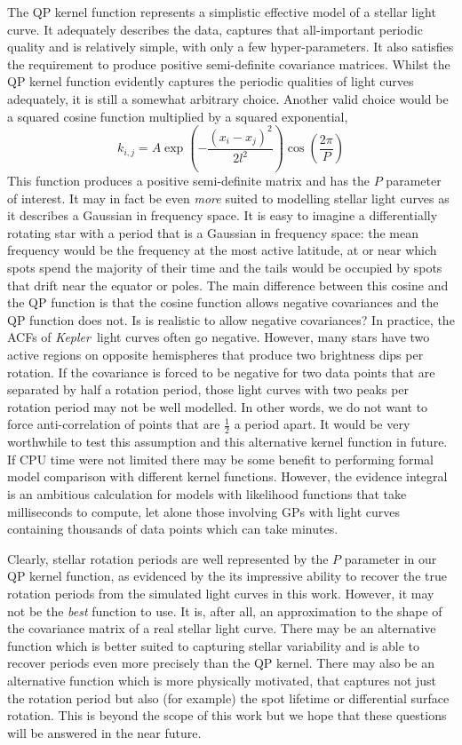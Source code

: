 \documentclass[useAMS, usenatbib, preprint, 12pt]{aastex}
\newcommand{\Kepler}{{\it Kepler}}
\begin{document}
The QP kernel function represents a simplistic effective model of a stellar
light curve.
It adequately describes the data, captures that all-important periodic quality
and is relatively simple, with only a few hyper-parameters.
It also satisfies the requirement to produce positive semi-definite covariance
matrices.
Whilst the QP kernel function evidently captures the periodic qualities of
light curves adequately, it is still a somewhat arbitrary choice.
Another valid choice would be a squared cosine function multiplied by a
squared exponential,
\begin{equation}
k_{i,j} = A \exp \left(-\frac{(x_i - x_j)^2}{2l^2}\right)
\cos\left(\frac{2\pi}{P}\right)
\end{equation}
\label{eq:cos_kernel}
This function produces a positive semi-definite matrix and has the $P$
parameter of interest.
It may in fact be even {\it more} suited to modelling stellar
light curves as it describes a Gaussian in frequency space.
It is easy to imagine a differentially rotating star with a period that is a
Gaussian in frequency space: the mean frequency would be the frequency at the
most active latitude, at or near which spots spend the majority of their time
and the tails would be occupied by spots that drift near the equator or poles.
The main difference between this cosine and the QP function is that the cosine
function allows negative covariances and the QP function does not.
Is is realistic to allow negative covariances?
In practice, the ACFs of \Kepler\ light curves often go negative.
However, many stars have two active regions on opposite hemispheres that
produce two brightness dips per rotation.
If the covariance is forced to be negative for two data points that are
separated by half a rotation period, those light curves with two peaks per
rotation period may not be well modelled.
In other words, we do not want to force anti-correlation of points that are
$\frac{1}{2}$ a period apart.
It would be very worthwhile to test this assumption and this alternative
kernel function in future.
If CPU time were not limited there may be some benefit to performing formal
model comparison with different kernel functions.
However, the evidence integral is an ambitious calculation for models with
likelihood functions that take milliseconds to compute, let alone those
involving GPs with light curves containing thousands of data points which can
take minutes.

Clearly, stellar rotation periods are well represented by the $P$ parameter in
our QP kernel function, as evidenced by the its impressive ability to recover
the true rotation periods from the simulated light curves in this work.
However, it may not be the {\it best} function to use.
It is, after all, an approximation to the shape of the covariance matrix of a
real stellar light curve.
There may be an alternative function which is better suited to capturing
stellar variability and is able to recover periods even more precisely than
the QP kernel.
There may also be an alternative function which is more physically motivated,
that captures not just the rotation period but also (for example) the spot
lifetime or differential surface rotation.
This is beyond the scope of this work but we hope that these questions will be
answered in the near future.
\end{document}
